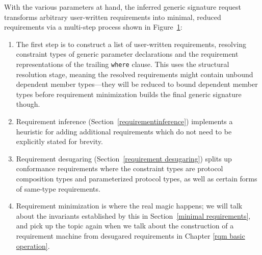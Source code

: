 \documentclass[../generics]{subfiles}
\begin{document}
\begin{figure}\label{inferred generic signature request figure}
\begin{center}
\end{center}
\end{figure}

With the various parameters at hand, the inferred generic signature request transforms arbitrary user-written requirements into minimal, reduced requirements via a multi-step process shown in Figure~\ref{inferred generic signature request figure}:
\begin{enumerate}
\item
{}%
%
The first step is to construct a list of user-written requirements, resolving constraint types of generic parameter declarations and the requirement representations of the trailing \texttt{where} clause. This uses the structural resolution stage, meaning the resolved requirements might contain unbound dependent member types---they will be reduced to bound dependent member types before requirement minimization builds the final generic signature though.
\item Requirement inference (Section~\ref{requirementinference}) implements a heuristic for adding additional requirements which do not need to be explicitly stated for brevity.
\item Requirement desugaring (Section~\ref{requirement desugaring}) splits up conformance requirements where the constraint types are protocol composition types and parameterized protocol types, as well as certain forms of same-type requirements.
\item Requirement minimization is where the real magic happens; we will talk about the invariants established by this in Section~\ref{minimal requirements}, and pick up the topic again when we talk about the construction of a requirement machine from desugared requirements in Chapter \ref{rqm basic operation}.
\end{enumerate}
\end{document}

